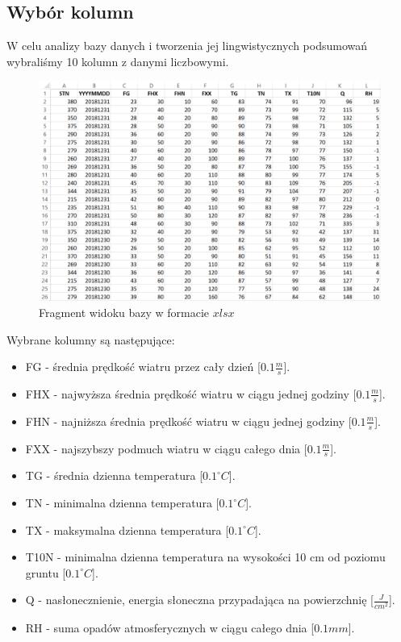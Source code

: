\documentclass{classrep}
\begin{document}
\subsection{Wybór kolumn}
W celu analizy bazy danych i tworzenia jej lingwistycznych podsumowań wybraliśmy 10 kolumn z danymi liczbowymi.

\begin{figure}[H]
	\centering
	\includegraphics[width=\textwidth]{Pictures/baza.png}
	\caption{Fragment widoku bazy w formacie $xlsx$}
\end{figure}

Wybrane kolumny są następujące:
\begin{itemize}[label=$\bullet$\scshape\bfseries]
\item FG - średnia prędkość wiatru przez cały dzień [$0.1 \frac{m}{s}$].
\item FHX - najwyższa średnia prędkość wiatru w ciągu jednej godziny [$0.1 \frac{m}{s}$].
\item FHN - najniższa średnia prędkość wiatru w ciągu jednej godziny [$0.1 \frac{m}{s}$].
\item FXX - najszybszy podmuch wiatru w ciągu całego dnia [$0.1 \frac{m}{s}$].
\item TG - średnia dzienna temperatura [$0.1^{\circ} C$].
\item TN - minimalna dzienna temperatura [$0.1^{\circ} C$].
\item TX - maksymalna dzienna temperatura [$0.1^{\circ} C$].
\item T10N - minimalna dzienna temperatura na wysokości 10 cm od poziomu gruntu [$0.1^{\circ} C$].
\item Q - nasłonecznienie, energia słoneczna przypadająca na powierzchnię [$\frac{J}{cm^2}$].
\item RH - suma opadów atmosferycznych w ciągu całego dnia [$0.1 mm$].\newline
\end{itemize}
\end{document}
